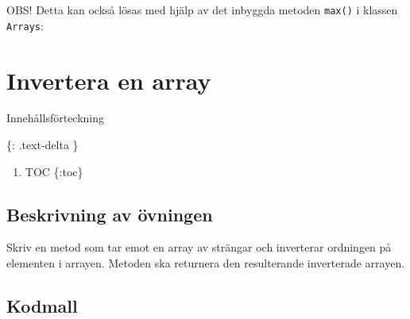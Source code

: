 OBS! Detta kan också lösas med hjälp av det inbyggda metoden
\texttt{max()} i klassen \texttt{Arrays}:

\hypertarget{cb4}{}
\begin{Shaded}
\begin{Highlighting}[]
 \OperatorTok{(}\OperatorTok{();}
\end{Highlighting}
\end{Shaded}

\hypertarget{invertera-en-array}{%
\section{Invertera en array}\label{invertera-en-array}}

Innehållsförteckning

\{: .text-delta \}

\begin{enumerate}
\def\labelenumi{\arabic{enumi}.}
\tightlist
\item
  TOC \{:toc\}
\end{enumerate}

\hypertarget{beskrivning-av-uxf6vningen}{%
\subsection{Beskrivning av övningen}\label{beskrivning-av-uxf6vningen}}

Skriv en metod som tar emot en array av strängar och inverterar
ordningen på elementen i arrayen. Metoden ska returnera den resulterande
inverterade arrayen.

\hypertarget{kodmall}{%
\subsection{Kodmall}\label{kodmall}}

